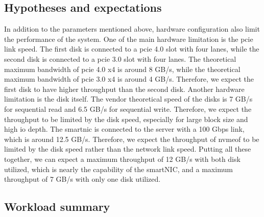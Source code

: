 \subsection{Hypotheses and expectations}

In addition to the parameters mentioned above, hardware configuration also limit the performance of the system. One of the main hardware limitation is the \acrshort{pcie} link speed. The first disk is connected to a \acrshort{pcie} 4.0 slot with four lanes, while the second disk is connected to a \acrshort{pcie} 3.0 slot with four lanes. The theoretical maximum bandwidth of \acrshort{pcie} 4.0 x4 is around 8 GB/s, while the theoretical maximum bandwidth of \acrshort{pcie} 3.0 x4 is around 4 GB/s. Therefore, we expect the first disk to have higher throughput than the second disk. Another hardware limitation is the disk itself. The vendor theoretical speed of the disks is 7 GB/s for sequential read and 6.5 GB/s for sequential write. Therefore, we expect the throughput to be limited by the disk speed, especially for large block size and high \acrshort{io} depth. The smartnic is connected to the server with a 100 Gbps link, which is around 12.5 GB/s. Therefore, we expect the throughput of \acrshort{nvmeof} to be limited by the disk speed rather than the network link speed. Putting all these together, we can expect a maximum throughput of 12 GB/s with both disk utilized, which is nearly the capability of the smartNIC, and a maximum throughput of 7 GB/s with only one disk utilized.

\subsection{Workload summary}

